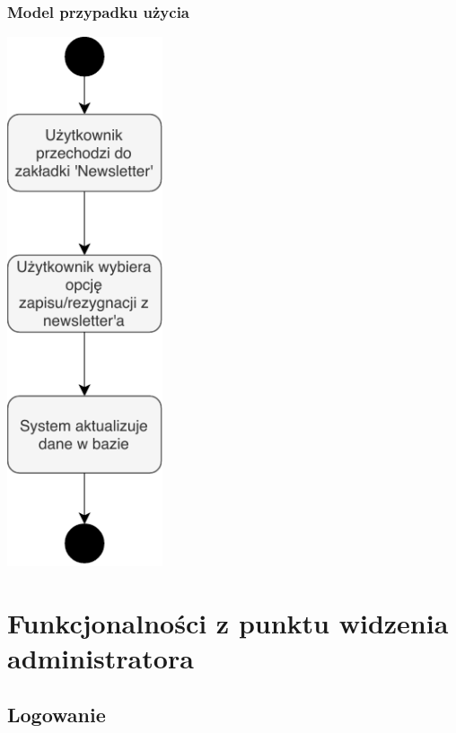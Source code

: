\documentclass[12pt]{report}
\begin{document}
			\subsection{Model przypadku użycia}
			\begin{center}
				\includegraphics[width=130pt]{newsletter.pdf}
			\end{center}
			
			
	
\chapter{Funkcjonalności z punktu widzenia administratora}
	
	
	\section{Logowanie}
\end{document}
